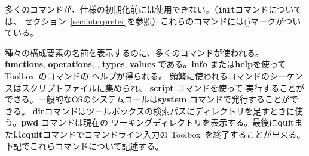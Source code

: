 \documentclass[\pformat,12pt]{jarticle}
\newcommand{\Toolbox}{Toolbox}
\newcommand{\cmd}{\tt }
\begin{document}
多くのコマンドが、仕様の初期化前には使用できない。（{\cmd init}コマンドについては、
セクション~\ref{sec:interpreter}を参照）これらのコマンドには({\tt *})マークがついている。

種々の構成要素の名前を表示するのに、多くのコマンドが使われる。
\textbf{functions}, \textbf{operations}, 
,
\textbf{types}, \textbf{values}
である。\textbf{info} または\textbf{help}を使って\Toolbox\ のコマンドの
ヘルプが得られる。
頻繁に使われるコマンドのシーケンスはスクリプトファイルに集められ、 \textbf{script} コマンドを使って
実行することができる。一般的なOSのシステムコールは\textbf{system} コマンドで発行することができる。
\textbf{dir}コマンドはツールボックスの検索パスにディレクトリを足すときに使う。\textbf{pwd} コマンドは現在の
ワーキングディレクトリを表示する。最後に\textbf{quit}または\textbf{cquit}コマンドでコマンドライン入力の
\Toolbox\ を終了することが出来る。下記でこれらコマンドについて記述する。
\end{document}
